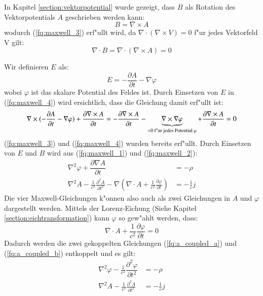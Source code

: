 In Kapitel \ref{section:vektorpotential} wurde gezeigt, dass $B$ als Rotation des Vektorpotentials $A$ geschrieben werden kann:
\begin{equation}
B = \nabla\times A 
\end{equation}
wodurch (\ref{fq:maxwell_3}) erf"ullt wird, da $\nabla \cdot ( \nabla\times V ) = 0$ f"ur jedes Vektorfeld V gilt:
\begin{equation*}
\nabla \cdot B = \nabla \cdot ( \nabla\times A ) = 0
\end{equation*}

Wir definieren $E$ als:
\begin{equation}
E = -\dfrac{\partial A}{\partial t} - \nabla \varphi
\end{equation}
wobei $\varphi$ ist das skalare Potential des Feldes ist. Durch Einsetzen von $E$ in (\ref{fq:maxwell_4}) wird ersichtlich, dass die Gleichung damit erf"ullt ist:
\begin{equation*}
\nabla\times (-\dfrac{\partial A}{\partial t} - \nabla \varphi) + \frac{\partial \nabla\times A }{\partial t} = 
- \frac{\partial \nabla\times A }{\partial t} - \underbrace{\nabla\times \nabla \varphi}_{=0\text{ f"ur jedes Potential } \varphi} + \frac{\partial \nabla\times A }{\partial t} = 0\\
\end{equation*}
(\ref{fq:maxwell_3}) und (\ref{fq:maxwell_4}) wurden bereits erf"ullt. Durch Einsetzen von $E$ und $B$ wird aus (\ref{fq:maxwell_1}) und (\ref{fq:maxwell_2}):
\begin{align} 
 \label{fq:a_coupled_a}
 \nabla^2 \varphi + \dfrac{\partial \nabla A}{\partial t} &= -\rho \\
 \label{fq:a_coupled_b}
 \nabla^2 A - \frac{1}{c^2} \frac{\partial^2 A }{\partial t^2} - \nabla \left( \nabla \cdot A + \frac{1}{c^2} \frac{\partial \varphi }{\partial t} \right) &= - \frac{1}{c} j
\end{align}
Die vier Maxwell-Gleichungen k"onnen also auch als zwei Gleichungen in $A$ und $\varphi$ dargestellt werden.
Mittels der Lorenz-Eichung (Siehe Kapitel \ref{section:eichtransformation}) kann $\varphi$ so gew"ahlt werden, dass:
\begin{equation} \label{fq:lorenz_eq}
\nabla \cdot A + \frac{1}{c^2} \frac{\partial \varphi }{\partial t} = 0
\end{equation}
Dadurch werden die zwei gekoppelten Gleichungen (\ref{fq:a_coupled_a}) und (\ref{fq:a_coupled_b}) entkoppelt und es gilt:
\begin{align*}
\nabla^2 \varphi - \frac{1}{c^2} \dfrac{\partial^2 \varphi}{\partial t^2} &= -\rho \\
\nabla^2 A - \frac{1}{c^2} \frac{\partial^2 A }{\partial t^2} &= - \frac{1}{c} j
\end{align*}

